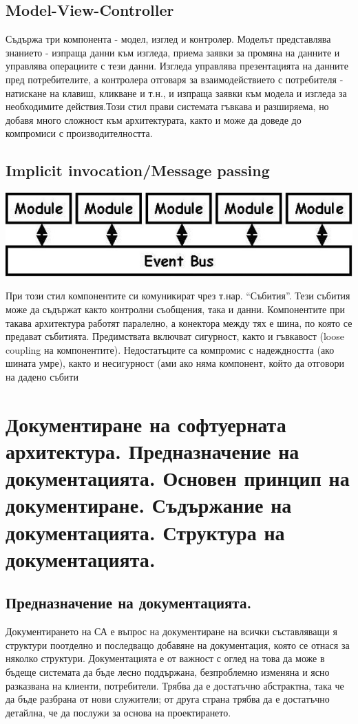 \documentclass[fleqn,12pt]{article}
\begin{document}
\subsection{Model-View-Controller}
Съдържа три компонента - модел, изглед и контролер.
Моделът представлява знанието - изпраща данни към изгледа, приема заявки за промяна на данните и управлява операциите с тези данни. Изгледа управлява презентацията на данните пред потребителите, а контролера отговаря за взаимодействието с потребителя - натискане на клавиш, кликване и т.н., и изпраща заявки към модела и изгледа за необходимите действия.Този стил прави системата гъвкава и разширяема, но добавя много сложност към архитектурата, както и може да доведе до компромиси с производителността.

\subsection{Implicit invocation/Message passing}
\includegraphics[width=175mm]{implicit_invocation.jpg}

При този стил компонентите си комуникират чрез т.нар. “Събития”. Тези събития може да съдържат както контролни съобщения, така и данни. Компонентите при такава архитектура работят паралелно, а конектора между тях е шина, по която се предават събитията. Предимствата включват сигурност, както и гъвкавост (loose coupling на компонентите). Недостатъците са компромис с надеждността (ако шината умре), както и несигурност (ами ако няма компонент, който да отговори на дадено събити

\section{Документиране на софтуерната архитектура. Предназначение на документацията. Основен принцип на документиране. Съдържание на документацията. Структура на документацията.}

\subsection{Предназначение на документацията.}
Документирането на СА е въпрос на документиране на всички съставляващи я структури поотделно и последващо добавяне на документация, която се отнася за няколко структури.
Документацията е от важност с оглед на това да може в бъдеще системата да бъде
лесно поддържана, безпроблемно изменяна и ясно разказвана на клиенти, потребители.
Трябва да е достатъчно абстрактна, така че да бъде разбрана от нови служители; от друга страна трябва да е достатъчно детайлна, че да послужи за основа на проектирането. 
\end{document}
